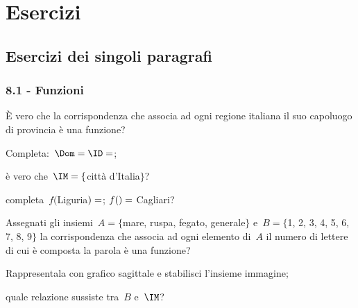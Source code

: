\section{Esercizi}
\subsection{Esercizi dei singoli paragrafi}
\subsubsection*{8.1 - Funzioni}
%

\begin{esercizio}
 \label{ese:8.1}
È vero che la corrispondenza che associa ad ogni regione italiana il suo capoluogo di provincia è una
funzione?

\begin{enumeratea}
\item Completa:~$\Dom = \ID = \dotfill$;
\item è vero che~$\IM = \{$città d'Italia$\}$?
\item completa~$f($Liguria$)=\dotfill$; $f(\dotfill)=$ Cagliari?
\end{enumeratea}
\end{esercizio}

\begin{esercizio}
 \label{ese:8.2}
Assegnati gli insiemi~$A=\{$mare, ruspa, fegato, generale$\}$ e~$B=\{$1, 2, 3, 4, 5, 6, 7, 8, 9$\}$ la corrispondenza
che associa ad ogni elemento di~$A$ il numero di lettere di cui è
composta la parola è una funzione?

\begin{enumeratea}
\item Rappresentala con grafico sagittale e stabilisci l'insieme immagine;
\item quale relazione sussiste tra~$B$ e~$\IM$?
\end{enumeratea}
\end{esercizio}

